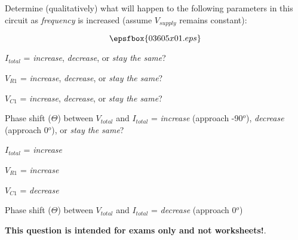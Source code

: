 

Determine (qualitatively) what will happen to the following parameters in this circuit as {\it frequency} is increased (assume $V_{supply}$ remains constant):

$$\epsfbox{03605x01.eps}$$

$I_{total}$ = {\it increase}, {\it decrease}, or {\it stay the same}?

\vskip 10pt

$V_{R1}$ = {\it increase}, {\it decrease}, or {\it stay the same}? 

\vskip 10pt

$V_{C1}$ = {\it increase}, {\it decrease}, or {\it stay the same}? 

\vskip 10pt

Phase shift ($\Theta$) between $V_{total}$ and $I_{total}$ = {\it increase} (approach -90$^{o}$), {\it decrease} (approach 0$^{o}$), or {\it stay the same}? 







$I_{total}$ = {\it increase}

\vskip 10pt

$V_{R1}$ = {\it increase} 

\vskip 10pt

$V_{C1}$ = {\it decrease}

\vskip 10pt

Phase shift ($\Theta$) between $V_{total}$ and $I_{total}$ = {\it decrease} (approach 0$^{o}$)







{\bf This question is intended for exams only and not worksheets!}.



